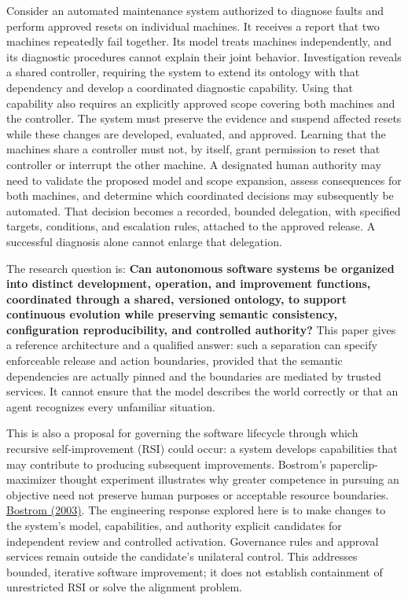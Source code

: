 \documentclass[preprint,12pt,authoryear]{elsarticle}
\begin{document}
Consider an automated maintenance system authorized to diagnose faults
and perform approved resets on individual machines. It receives a report
that two machines repeatedly fail together. Its model treats machines
independently, and its diagnostic procedures cannot explain their joint
behavior. Investigation reveals a shared controller, requiring the
system to extend its ontology with that dependency and develop a
coordinated diagnostic capability. Using that capability also requires
an explicitly approved scope covering both machines and the controller.
The system must preserve the evidence and suspend affected resets while
these changes are developed, evaluated, and approved. Learning that the
machines share a controller must not, by itself, grant permission to
reset that controller or interrupt the other machine. A designated human
authority may need to validate the proposed model and scope expansion,
assess consequences for both machines, and determine which coordinated
decisions may subsequently be automated. That decision becomes a
recorded, bounded delegation, with specified targets, conditions, and
escalation rules, attached to the approved release. A successful
diagnosis alone cannot enlarge that delegation.

The research question is: \textbf{Can autonomous software systems be
organized into distinct development, operation, and improvement
functions, coordinated through a shared, versioned ontology, to support
continuous evolution while preserving semantic consistency,
configuration reproducibility, and controlled authority?} This paper
gives a reference architecture and a qualified answer: such a separation
can specify enforceable release and action boundaries, provided that the
semantic dependencies are actually pinned and the boundaries are
mediated by trusted services. It cannot ensure that the model describes
the world correctly or that an agent recognizes every unfamiliar
situation.

This is also a proposal for governing the software lifecycle through
which recursive self-improvement (RSI) could occur: a system develops
capabilities that may contribute to producing subsequent improvements.
Bostrom's paperclip-maximizer thought experiment illustrates why greater
competence in pursuing an objective need not preserve human purposes or
acceptable resource boundaries.
\href{https://nickbostrom.com/papers/ethical-issues-in-advanced-ai/}{Bostrom
(2003)}. The engineering response explored here is to make changes to
the system's model, capabilities, and authority explicit candidates for
independent review and controlled activation. Governance rules and
approval services remain outside the candidate's unilateral control.
This addresses bounded, iterative software improvement; it does not
establish containment of unrestricted RSI or solve the alignment
problem.
\end{document}
